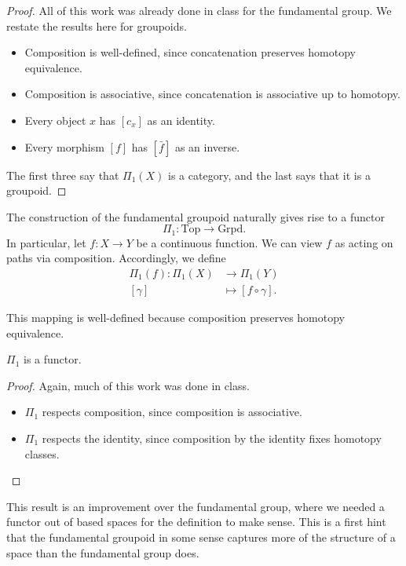 \begin{proof}
	All of this work was already done in class for the fundamental group. We restate the results here for groupoids.
	\begin{itemize}
		\item Composition is well-defined, since concatenation preserves homotopy equivalence.
		\item Composition is associative, since concatenation is associative up to homotopy.
		\item Every object $x$ has $[c_x]$ as an identity.
		\item Every morphism $[f]$ has $[\bar{f}]$ as an inverse.
	\end{itemize}

	The first three say that $\Pi_1(X)$ is a category, and the last says that it is a groupoid.
\end{proof}

The construction of the fundamental groupoid naturally gives rise to a functor
$$\Pi_1: \text{Top}\rightarrow\text{Grpd}.$$ In particular, let $f:
	X\rightarrow Y$ be a continuous function. We can view $f$ as acting on paths
via composition. Accordingly, we define
\begin{align*}
	\Pi_1(f)  \colon \Pi_1(X) & \to \Pi_1(Y)            \\
	[\gamma]                  & \mapsto [f\circ\gamma].
\end{align*}


This mapping is well-defined because composition preserves homotopy equivalence.

\begin{prop}\label{fundamental groupoid is a functor}
	$\Pi_1$ is a functor.
\end{prop}

\begin{proof}
	Again, much of this work was done in class.
	\begin{itemize}
		\item $\Pi_1$ respects composition, since composition is associative.
		\item $\Pi_1$ respects the identity, since composition by the identity
		      fixes homotopy classes. \qedhere
	\end{itemize}
\end{proof}

This result is an improvement over the fundamental group, where we needed a
functor out of based spaces for the definition to make sense. This is a first
hint that the fundamental groupoid in some sense captures more of the structure
of a space than the fundamental group does.

